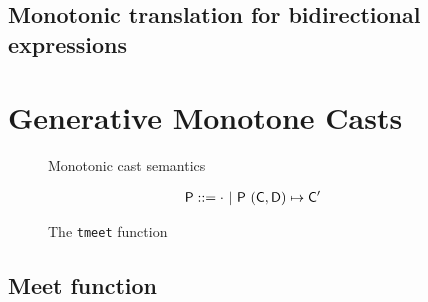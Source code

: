 \documentclass[sigconf]{acmart}
\begin{document}


\subsection{Monotonic translation for bidirectional expressions}


\section{Generative Monotone Casts}


\begin{figure}[!h]

\begin{mathpar}
\end{mathpar}
{Monotonic cast semantics}

\begin{align*}
\P &::= \cdot \B \P ~{{(\C,\D)}\mapsto\Cp}
\end{align*}
\begin{mathpar}




\end{mathpar}
\caption{The \texttt{tmeet} function}
\end{figure}

\subsection{Meet function}\label{monmeet}
\end{document}
